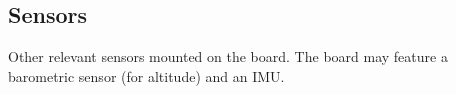 \subsection{Sensors}

Other relevant sensors mounted on the board.
The board may feature a barometric sensor (for altitude) and an IMU.
